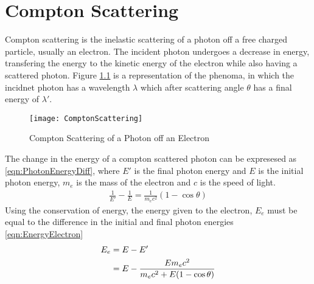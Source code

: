 \chapter{Compton Scattering}
\label{chap:ComptonScatter}

Compton scattering is the inelastic scattering of a photon off a free charged particle, usually an electron.
The incident photon undergoes a decrease in energy, transfering the energy to the kinetic energy of the electron while also having a scattered photon.
Figure \ref{fig:ComptonScattering} is a representation of the phenoma, in which the incidnet photon has a wavelength $\lambda$ which after scattering angle $\theta$ has a final energy of $\lambda'$.
\begin{figure}
  \centering
  \texttt{[image: ComptonScattering]}
  \caption{Compton Scattering of a Photon off an Electron}
  \label{fig:ComptonScattering}
\end{figure}
The change in the energy of a compton scattered photon can be expresesed as \eqref{eqn:PhotonEnergyDiff}, where $E'$ is the final photon energy and $E$ is the initial photon energy, $m_e$ is the mass of the electron and $c$ is the speed of light.
\begin{align}
  \label{eqn:FinalPhotonEnergy}
  \frac{1}{E'} -\frac{1}{E} = \frac{1}{m_e c^2}\left(1-\cos\theta\right) 
\end{align}
Using the conservation of energy, the energy given to the electron, $E_e$ must be equal to the difference in the initial and final photon energies \eqref{eqn:EnergyElectron}
\begin{align}
  \label{eqn:EnergyElectron}
  E_e &= E - E' \\ \notag
   &= E - \frac{E m_e c^2}{m_e c^2 + E (1-\cos\theta)}
\end{align}

